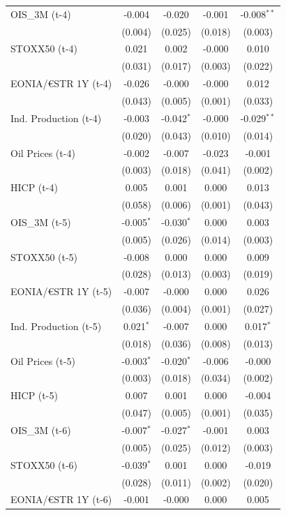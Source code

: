 \begin{longtable}[t]{lcccc}
OIS\_3M (t-4) & -0.004 & -0.020 & -0.001 & -0.008$^{**}$\\
 & (0.004) & (0.025) & (0.018) & (0.003)\\
STOXX50 (t-4) & 0.021 & 0.002 & -0.000 & 0.010\\
 & (0.031) & (0.017) & (0.003) & (0.022)\\
EONIA/€STR 1Y (t-4) & -0.026 & -0.000 & -0.000 & 0.012\\
 & (0.043) & (0.005) & (0.001) & (0.033)\\
Ind. Production (t-4) & -0.003 & -0.042$^{*}$ & -0.000 & -0.029$^{**}$\\
 & (0.020) & (0.043) & (0.010) & (0.014)\\
Oil Prices (t-4) & -0.002 & -0.007 & -0.023 & -0.001\\
 & (0.003) & (0.018) & (0.041) & (0.002)\\
HICP (t-4) & 0.005 & 0.001 & 0.000 & 0.013\\
 & (0.058) & (0.006) & (0.001) & (0.043)\\
OIS\_3M (t-5) & -0.005$^{*}$ & -0.030$^{*}$ & 0.000 & 0.003\\
 & (0.005) & (0.026) & (0.014) & (0.003)\\
STOXX50 (t-5) & -0.008 & 0.000 & 0.000 & 0.009\\
 & (0.028) & (0.013) & (0.003) & (0.019)\\
EONIA/€STR 1Y (t-5) & -0.007 & -0.000 & 0.000 & 0.026\\
 & (0.036) & (0.004) & (0.001) & (0.027)\\
Ind. Production (t-5) & 0.021$^{*}$ & -0.007 & 0.000 & 0.017$^{*}$\\
 & (0.018) & (0.036) & (0.008) & (0.013)\\
Oil Prices (t-5) & -0.003$^{*}$ & -0.020$^{*}$ & -0.006 & -0.000\\
 & (0.003) & (0.018) & (0.034) & (0.002)\\
HICP (t-5) & 0.007 & 0.001 & 0.000 & -0.004\\
 & (0.047) & (0.005) & (0.001) & (0.035)\\
OIS\_3M (t-6) & -0.007$^{*}$ & -0.027$^{*}$ & -0.001 & 0.003\\
 & (0.005) & (0.025) & (0.012) & (0.003)\\
STOXX50 (t-6) & -0.039$^{*}$ & 0.001 & 0.000 & -0.019\\
 & (0.028) & (0.011) & (0.002) & (0.020)\\
EONIA/€STR 1Y (t-6) & -0.001 & -0.000 & 0.000 & 0.005\\

\end{longtable}

